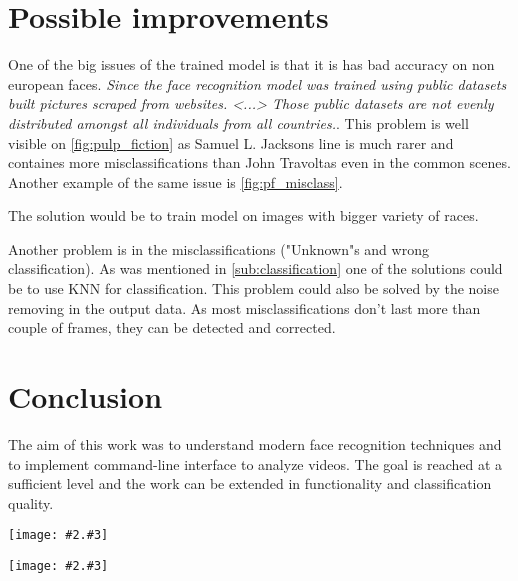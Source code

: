 \documentclass[hidelinks, english]{mvi-report}
\newcommand{\smplimage}[3][1]{
\centerline{
    \texttt{[image: \#2.\#3]}
}
}
\begin{document}
\section{Possible improvements}

One of the big issues of the trained model is that it is has bad accuracy on non european faces.
\textit{Since the face recognition model was trained using public datasets built pictures scraped from websites. <...>
Those public datasets are not evenly distributed amongst all individuals from all
countries.}\cite{face_recognition_error}. This problem is well visible on \cref{fig:pulp_fiction} as Samuel L. Jacksons
line is much rarer and containes more misclassifications than John Travoltas even in the common scenes. Another example
of the same issue is \cref{fig:pf_misclass}.

The solution would be to train model on images with bigger variety of races.

Another problem is in the misclassifications ("Unknown"s and wrong classification). As was mentioned in
\cref{sub:classification} one of the solutions could be to use KNN for classification. This problem could also be solved
by the noise removing in the output data. As most misclassifications don't last more than couple of frames, they can be
detected and corrected.


\section{Conclusion}

The aim of this work was to understand modern face recognition techniques and to implement command-line interface to
analyze videos. The goal is reached at a sufficient level and the work can be extended in functionality and
classification quality.




\begin{figure*}[t]
    \centering
    \smplimage[1]{pulp_fiction}{png}
    \caption{Pulp fiction analysis.}
    \label{fig:pulp_fiction}
\end{figure*}

\begin{figure*}[t]
    \centering
    \smplimage[1]{reservoir_dogs}{png}
    \caption{Reservoir dogs analysis.}
    \label{fig:reservoir_dogs}
\end{figure*}
\end{document}

